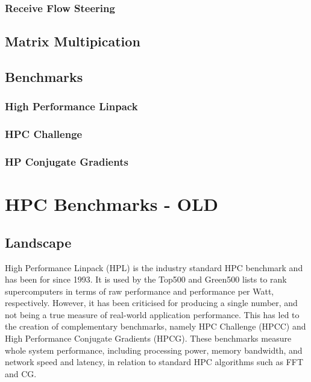 \documentclass{report}
\begin{document}
\subsection{Receive Flow Steering}


%
%
\section{Matrix Multipication}


%
%
\section{Benchmarks}

\subsection{High Performance Linpack}

\subsection{HPC Challenge}

\subsection{HP Conjugate Gradients}


%
%
\chapter{HPC Benchmarks - OLD}


%
%
\section{Landscape}

High Performance Linpack (HPL) is the industry standard HPC benchmark and has been for since 1993. It is used by the Top500 and Green500 lists to rank supercomputers in terms of raw performance and performance per Watt, respectively. However, it has been criticised for producing a single number, and not being a true measure of real-world application performance. This has led to the creation of complementary benchmarks, namely HPC Challenge (HPCC) and High Performance Conjugate Gradients (HPCG). These benchmarks measure whole system performance, including processing power, memory bandwidth, and network speed and latency, in relation to standard HPC algorithms such as FFT and CG.
\end{document}
